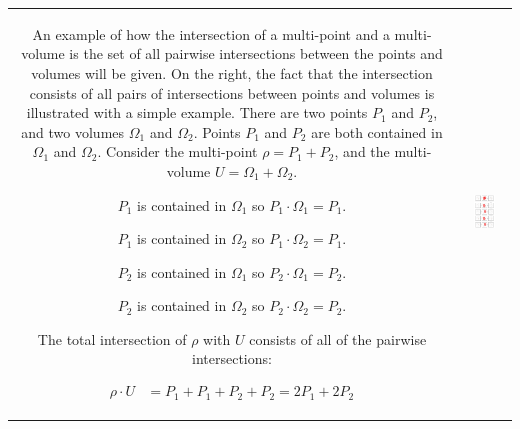 \documentclass{book}
\begin{document}
\begin{center}
\begin{tabular}{cc}
\parbox{0.5\textwidth}{
An example of how the intersection of a multi-point and a multi-volume is the set of all pairwise intersections between the points and volumes will be given. On the right, the fact that the intersection consists of all pairs of intersections between points and volumes is illustrated with a simple example. There are two points \(P_1\) and \(P_2\), and two volumes \(\Omega_1\) and \(\Omega_2\). Points \(P_1\) and \(P_2\) are both contained in \(\Omega_1\) and \(\Omega_2\). Consider the multi-point \(\rho = P_1 + P_2\), and the multi-volume \(U = \Omega_1 + \Omega_2\). 

\(P_1\) is contained in \(\Omega_1\) so \(P_1 \cdot \Omega_1 = P_1\).  

\(P_1\) is contained in \(\Omega_2\) so \(P_1 \cdot \Omega_2 = P_1\).

\(P_2\) is contained in \(\Omega_1\) so \(P_2 \cdot \Omega_1 = P_2\).

\(P_2\) is contained in \(\Omega_2\) so \(P_2 \cdot \Omega_2 = P_2\).

The total intersection of \(\rho\) with \(U\) consists of all of the pairwise intersections:

\begin{align*}
\rho \cdot U & = P_1 + P_1 + P_2 + P_2 
= 2P_1 + 2P_2  
\end{align*}
} & \parbox{0.5\textwidth}{
\includegraphics[width = 0.5\textwidth]{Intersections/Point-volume_intersections/point_volume_intersection_distributive_law}
}
\end{tabular}
\end{center} 
\end{document}
